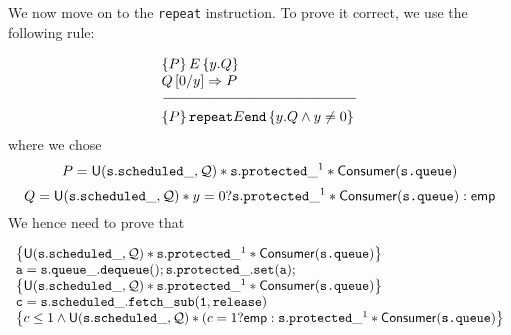 We now move on to the \texttt{repeat} instruction. To prove it correct, we use the following rule:

\begin{equation*}
		\begin{array}{l}
			\left\{P\right\} E \left\{y.Q\right\} \\
			Q\left[0 / y \right] \Rightarrow P \\
				\frac{}{\textcolor{white}{\left\{ P\right\} \texttt{repeat} E \texttt{end} \left\{ y.iiiiiiiiiiiiiii Q \land y \neq 0 \right\}}}\\
			\left\{ P\right\} \texttt{repeat} E \texttt{end} \left\{ y. Q \land y \neq 0 \right\}
		\end{array}
\end{equation*}
where we chose 
$$P = \mathsf{U}(\mathtt{s.scheduled\_}, \mathcal{Q}) * \mathtt{s.protected\_}^1 * \mathsf{Consumer}(\texttt{s.queue}) $$
$$Q = \mathsf{U}(\mathtt{s.scheduled\_}, \mathcal{Q}) * y = 0 ? \mathtt{s.protected\_}^1 * \mathsf{Consumer}(\texttt{s.queue}): \mathsf{emp}  $$
We hence need to prove that 

\begin{equation*}
	\begin{array}{l}
		\left\{\mathsf{U}(\mathtt{s.scheduled\_}, \mathcal{Q}) * \mathtt{s.protected\_}^1 * \mathsf{Consumer}(\texttt{s.queue}) \right\} \\
		\mathtt{a = s.queue\_.dequeue(); s.protected\_.set(a);} \\
		\left\{\mathsf{U}(\mathtt{s.scheduled\_}, \mathcal{Q}) * \mathtt{s.protected\_}^1 * \mathsf{Consumer}(\texttt{s.queue}) \right\} \\
		\mathtt{c = s.scheduled\_.fetch\_sub(1, release)} \\
		\left\{ c \leq 1 \land \mathsf{U}(\mathtt{s.scheduled\_}, \mathcal{Q}) * (c = 1 ? \mathsf{emp} : \mathtt{s.protected\_}^1 * \mathsf{Consumer}(\texttt{s.queue}) \right\}
	\end{array}
\end{equation*}


